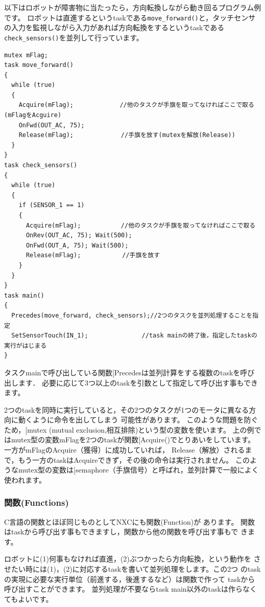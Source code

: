 \documentclass[11pt]{jarticle}
\makeatletter
\def\bfindex{\@ifnextchar[{\@bfindex}{\@@bfindex}}
\def\@bfindex[#1]#2{\textbf{#2}\index{#1@#2}}
\def\@@bfindex#1{\textbf{#1}\index{#1}}
\def\nmindex{\@ifnextchar[{\@nmindex}{\@@nmindex}}
\def\@nmindex[#1]#2{#2\index{#1@#2}}
\def\@@nmindex#1{#1\index{#1}}
\makeatother
\begin{document}
以下はロボットが障害物に当たったら，方向転換しながら動き回るプログラム例です。
ロボットは直進するというtaskである\verb|move_forward()|と，タッチセンサ
の入力を監視しながら入力があれば方向転換をするというtaskである
\verb|check_sensors()|を並列して行っています。

\begin{screen}{\small
\begin{verbatim}
mutex mFlag; 
task move_forward() 
{ 
  while (true) 
  { 
    Acquire(mFlag); 　　　　　　　//他のタスクが手旗を取ってなければここで取る(mFlagをAcguire)
    OnFwd(OUT_AC, 75);
    Release(mFlag); 　　　　　　  //手旗を放す(mutexを解放(Release))
  } 
} 
task check_sensors() 
{ 
  while (true) 
  { 
    if (SENSOR_1 == 1) 
    { 
      Acquire(mFlag); 　　　　　　//他のタスクが手旗を取ってなければここで取る
      OnRev(OUT_AC, 75); Wait(500); 
      OnFwd(OUT_A, 75); Wait(500); 
      Release(mFlag); 　　　　　  //手旗を放す
    } 
  } 
} 
task main() 
{ 
  Precedes(move_forward, check_sensors);//2つのタスクを並列処理することを指定
  SetSensorTouch(IN_1); 　            //task mainの終了後，指定したtaskの実行がはじまる
} 
\end{verbatim}}
\end{screen}

タスクmainで呼び出している関数\nmindex{Precedes}は並列計算をする複数のtaskを呼び出します．
必要に応じて3つ以上のtaskを引数として指定して呼び出す事もできます。

2つのtaskを同時に実行していると，その2つのタスクが1つのモータに異なる方向に動くように命令を出してしまう
可能性があります。
このような問題を防ぐため，\bfindex{mutex} (mutual exclusion,相互排除)という型の変数を使います。
上の例ではmutex型の変数mFlagを2つのtaskが関数\nmindex{Acquire()}でとりあいをしています。
一方がmFlagのAcquire（獲得）に成功していれば，
Release（解放）されるまで，もう一方のtaskはAcquireできず，その後の命令は実行されません。
このようなmutex型の変数は\bfindex{semaphore}（手旗信号）と呼ばれ，並列計算で一般によく使われます。


\subsubsection{関数(Functions)}
C言語の関数とほぼ同じものとしてNXCにも関数(Function)が
あります。
関数はtaskから呼び出す事もできますし，関数から他の関数を呼び出す事もで
きます。

ロボットに(1)何事もなければ直進，(2)ぶつかったら方向転換，という動作を
させたい時には(1)，(2)に対応するtaskを書いて並列処理をします。この2つ
のtaskの実現に必要な実行単位（前進する，後進するなど）は関数で作って
taskから呼び出すことができます。
並列処理が不要ならtask main以外のtaskは作らなくてもよいです。
\end{document}

